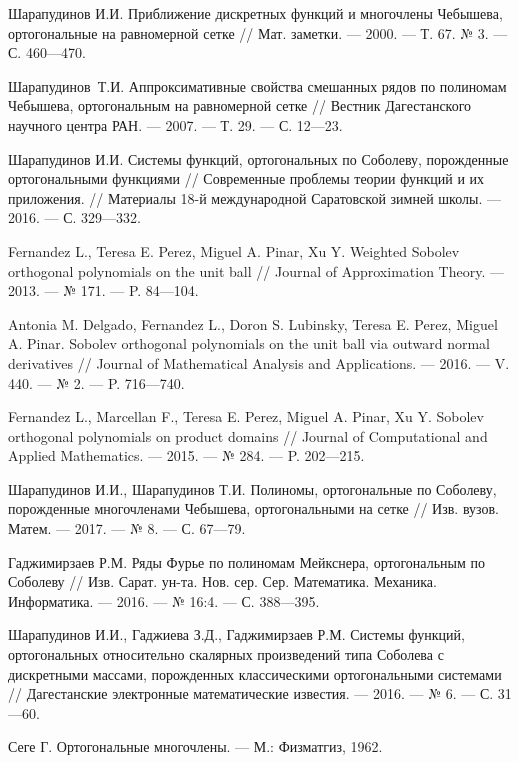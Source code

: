 \begin{thebibliography}{111}
{Шарапудинов И.И.}
Приближение дискретных функций и многочлены Чебышева, ортогональные на равномерной сетке //
Мат. заметки. --- 2000. --- Т. 67. № 3. --- С. 460---470.


{Шарапудинов~Т.И.}
Аппроксимативные свойства смешанных рядов по полиномам Чебышева, ортогональным на равномерной сетке //
Вестник Дагестанского научного центра РАН. --- 2007. --- Т. 29. --- С. 12---23.


{Шарапудинов И.И.}
Системы функций, ортогональных по Соболеву, порожденные ортогональными функциями //
Современные проблемы теории функций и их приложения. // Материалы 18-й международной Саратовской зимней школы. --- 2016. --- С. 329---332.


{Fernandez L., Teresa E. Perez, Miguel A. Pinar, Xu Y.} Weighted Sobolev orthogonal polynomials on the unit ball // Journal of Approximation Theory. --- 2013. --- № 171. --- P. 84---104.


{Antonia M. Delgado, Fernandez L., Doron S. Lubinsky, Teresa E. Perez, Miguel A. Pinar.} Sobolev orthogonal polynomials on the unit ball via outward normal derivatives // Journal of Mathematical Analysis and Applications. --- 2016. --- V. 440. --- № 2. --- P. 716---740.


{Fernandez L., Marcellan F., Teresa E. Perez, Miguel A. Pinar, Xu Y.} Sobolev orthogonal polynomials on product domains // Journal of Computational and Applied Mathematics. --- 2015. --- № 284. --- P. 202---215.


{Шарапудинов И.И., Шарапудинов Т.И.} Полиномы, ортогональные по Соболеву, порожденные многочленами Чебышева, ортогональными на сетке // Изв. вузов. Матем. --- 2017. --- № 8. --- С. 67---79.


{Гаджимирзаев Р.М.} Ряды Фурье по полиномам Мейкснера, ортогональным по Соболеву // Изв. Сарат. ун-та. Нов. сер. Сер. Математика. Механика. Информатика. --- 2016. --- № 16:4. --- С. 388---395.


{Шарапудинов И.И., Гаджиева З.Д., Гаджимирзаев Р.М.} Системы функций, ортогональных относительно скалярных произведений типа Соболева с дискретными массами, порожденных классическими ортогональными системами // Дагестанские электронные математические известия. --- 2016. --- № 6. --- С. 31---60.


{Сеге Г.} Ортогональные многочлены. --- М.: Физматгиз, 1962.


\end{thebibliography}
